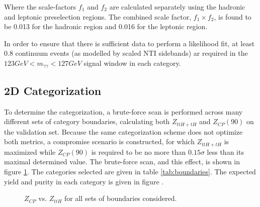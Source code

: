 Where the scale-factors $f_{1}$ and $f_{2}$ are calculated separately using the hadronic and leptonic preselection regions. The combined scale factor, $f_{1} \times f_{2}$, is found to be 0.013 for the hadronic region and 0.016 for the leptonic region. 

In order to ensure that there is sufficient data to perform a likelihood fit, at least 0.8 continuum events (as modelled by scaled NTI sidebands) ar required in the $123 GeV < m_{\gamma\gamma} < 127 GeV$ signal window in each category.

\subsection{2D Categorization}

To determine the categorization, a brute-force scan is performed across many different sets of category boundaries, calculating both $Z_{ttH+tH}$ and $Z_{CP}(90)$ on the validation set. Because the same categorization scheme does not optimize both metrics, a compromise scenario is constructed, for which $Z_{ttH+tH}$ is maximized while $Z_{CP}(90)$ is required to be no more than $0.15\sigma$ less than its maximal determined value. The brute-force scan, and this effect, is shown in figure \ref{fig:optimal}. The categories selected are given in table \ref{tab:boundaries}. The expected yield and purity in each category is given in figure .

\begin{figure}[htbp]
 \centering
  \caption{$Z_{CP}$ vs. $Z_{ttH}$ for all sets of boundaries considered.}
  \label{fig:optimal}
\end{figure}

